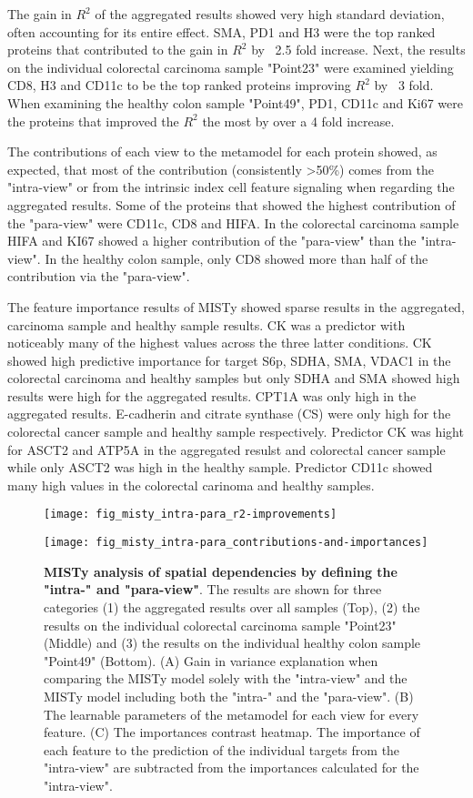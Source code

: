 The gain in $R^2$ of the aggregated results showed very high standard deviation, often accounting for its entire effect. SMA, PD1 and H3 were the top ranked proteins that contributed to the gain in $R^2$ by ~2.5 fold increase. Next, the results on the individual colorectal carcinoma sample "Point23" were examined yielding CD8, H3 and CD11c to be the top ranked proteins improving $R^2$ by ~3 fold. When examining the healthy colon sample "Point49", PD1, CD11c and Ki67 were the proteins that improved the $R^2$ the most by over a 4 fold increase.

The contributions of each view to the metamodel for each protein showed, as expected, that most of the contribution (consistently >50\%) comes from the "intra-view" or from the intrinsic index cell feature signaling when regarding the aggregated results. Some of the proteins that showed the highest contribution of the "para-view" were CD11c, CD8 and HIFA. In the colorectal carcinoma sample HIFA and KI67 showed a higher contribution of the "para-view" than the "intra-view". In the healthy colon sample, only CD8 showed more than half of the contribution via the "para-view". 

The feature importance results of MISTy showed sparse results in the aggregated, carcinoma sample and healthy sample results. CK was a predictor with noticeably many of the highest values across the three latter conditions. CK showed high predictive importance for target S6p, SDHA, SMA, VDAC1 in the colorectal carcinoma and healthy samples but only SDHA and SMA showed high results were high for the aggregated results. CPT1A was only high in the aggregated results. E-cadherin and citrate synthase (CS) were only high for the colorectal cancer sample and healthy sample respectively. Predictor CK was hight for ASCT2 and ATP5A in the aggregated resulst and colorectal cancer sample while only ASCT2 was high in the healthy sample. Predictor CD11c showed many high values in the colorectal carinoma and healthy samples.

\begin{figure}[hb!]
    \centering
    \texttt{[image: fig\_misty\_intra-para\_r2-improvements]}
\end{figure}

\begin{figure}[p]
    \centering
    \texttt{[image: fig\_misty\_intra-para\_contributions-and-importances]}
    \caption{\textbf{MISTy analysis of spatial dependencies by defining the "intra-" and "para-view"}. The results are shown for three categories (1) the aggregated results over all samples (Top), (2) the results on the individual colorectal carcinoma sample "Point23" (Middle) and (3) the results on the individual healthy colon sample "Point49" (Bottom). (A) Gain in variance explanation when comparing the MISTy model solely with the "intra-view" and the MISTy model including both the "intra-" and the "para-view". (B) The learnable parameters of the metamodel for each view for every feature. (C) The importances contrast heatmap. The importance of each feature to the prediction of the individual targets from the "intra-view" are subtracted from the importances calculated for the "intra-view".}
    \label{fig:misty}
\end{figure}

